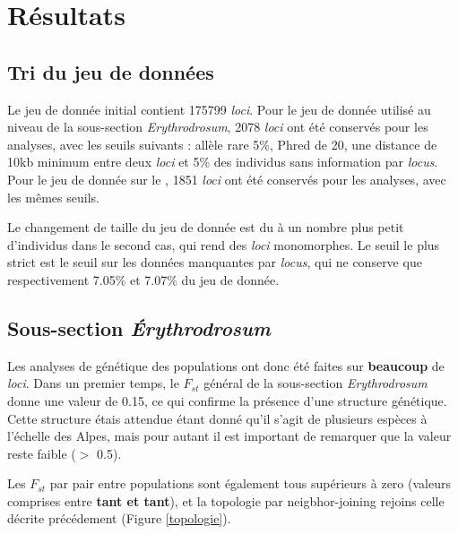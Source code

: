 \section{Résultats}

\subsection{Tri du jeu de données}

Le jeu de donnée initial contient 175799 \textit{loci}. Pour le jeu de donnée utilisé au niveau de la sous-section \textit{Erythrodrosum}, 2078 \textit{loci} ont été conservés pour les analyses, avec les seuils suivants : allèle rare 5\%, Phred de 20, une distance de 10kb minimum entre deux \textit{loci} et 5\% des individus sans information par \textit{locus}.
Pour le jeu de donnée sur le , 1851 \textit{loci} ont été conservés pour les analyses, avec les mêmes seuils.

Le changement de taille du jeu de donnée est du à un nombre plus petit d'individus dans le second cas, qui rend des \textit{loci} monomorphes. Le seuil le plus strict est le seuil sur les données manquantes par \textit{locus}, qui ne conserve que  respectivement 7.05\% et 7.07\% du jeu de donnée. 

\subsection{Sous-section \textit{Érythrodrosum}}

Les analyses de génétique des populations ont donc été faites sur \textbf{beaucoup} de \textit{loci}. Dans un premier temps, le $F_{st}$ général de la sous-section \textit{Erythrodrosum} donne une valeur de 0.15, ce qui confirme la présence d'une structure génétique. Cette structure étais attendue étant donné qu'il s'agit de plusieurs espèces à l'échelle des Alpes, mais pour autant il est important de remarquer que la valeur reste faible ($>$ 0.5).



Les $F_{st}$ par pair entre populations sont également tous supérieurs à zero (valeurs comprises entre \textbf{tant et tant}), et la topologie par neigbhor-joining rejoins celle décrite précédement (Figure \ref{topologie}).

